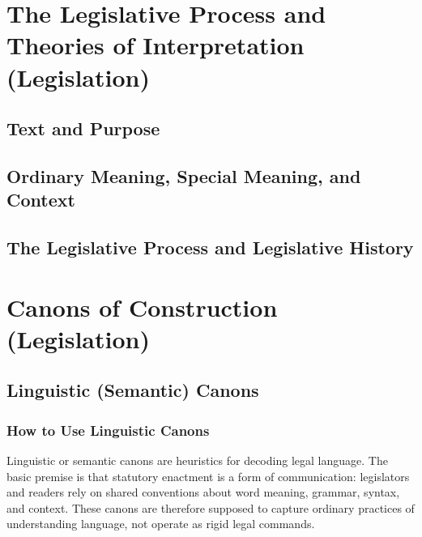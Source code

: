 \documentclass[11pt]{tex/lawoutline}
\begin{document}
\maketitle
\tableofcontents

\chapter{The Legislative Process and Theories of Interpretation (Legislation)}

\section{Text and Purpose}

\section{Ordinary Meaning, Special Meaning, and
Context}

\section{The Legislative Process and Legislative History}

\chapter{Canons of Construction (Legislation)}

\section{Linguistic (Semantic) Canons}

\subsection{How to Use Linguistic Canons}

Linguistic or semantic canons are heuristics for decoding legal language. The basic premise is that statutory enactment is a form of communication: legislators and readers rely on shared conventions about word meaning, grammar, syntax, and context. These canons are therefore supposed to capture ordinary practices of understanding language, not operate as rigid legal commands.
\end{document}
